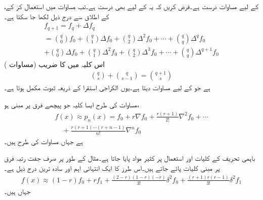   کے لیے مساوات  درست ہے۔فرض کریں کہ یہ   کے لیے بھی درست ہے۔تب مساوات  میں  استعمال کر کے،  کے اطلاق سے درج ذیل لکھا جا سکتا ہے۔
\begin{multline*}
f_{q+1}=f_q+\Delta f_q\\
=\binom{q}{0}f_0+\binom{q}{1} \Delta f_0+\binom{q}{2}\Delta^2 f_0+\cdots +\binom{q}{q}\Delta^q f_0\\
+\binom{q}{0}\Delta f_0+\binom{q}{1}\Delta^2 f_0+\binom{q}{2}\Delta^3 f_0+\cdots +\binom{q}{q}\Delta^{q+1} f_0
\end{multline*}
اس کلیہ میں  کا  ضریب  (مساوات )
\begin{align*}
\binom{q}{s}+\binom{q}{s-1}=\binom{q+1}{s}
\end{align*}
ہے جو  کے لیے مساوات  دیتا ہے۔یوں الکراجی استقرا کے ذریعہ ثبوت مکمل ہوتا ہے۔

مساوات  کی طرح ایسا کلیہ جو پیچھے فرق پر مبنی ہو،  
\begin{multline}\label{مساوات_اعدادی_نیوٹن_باہمی_تحریف_پیچھے}
f(x)\approx p_n(x)=f_0+r\nabla f_0+\frac{r(r+1)}{2!}\nabla^2 f_0+\cdots\\
\quad +\frac{r(r+1)\cdots (r+n-1)}{n!}\nabla ^n f_0
\end{multline}
ہے جہاں مساوات  کی طرح  ہیں۔

باہمی تحریف کے کلیات اور استعمال پر کثیر مواد پایا جاتا ہے۔مثال کے طور پر  صرف جفت رتبہ فرق پر مبنی کلیات پائے جاتے ہیں۔اس طرز کا ایک انتہائی اہم اور  سادہ ترین   درج ذیل ہے۔
\begin{align}\label{مساوات_اعدادی_کلیہ_ایورٹ}
f(x)\approx (1-r)f_0+rf_1+\frac{(2-r)(1-r)(-r)}{3!}\delta^2f_0+\frac{(r+1)r(r-1)}{3!}\delta^2f_1
\end{align}   
جہاں  ہیں۔


